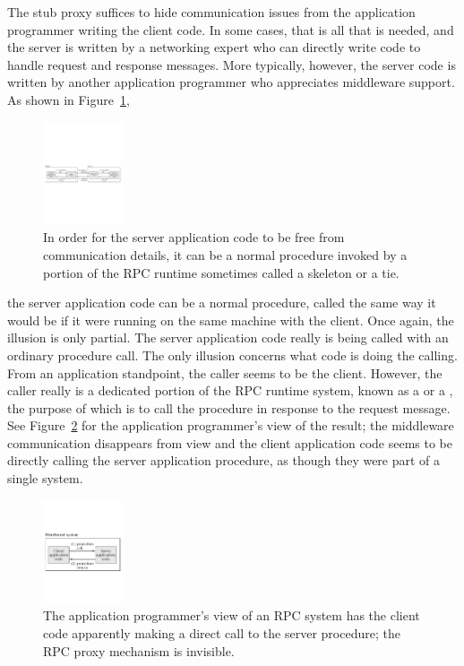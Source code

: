 The stub proxy suffices to hide communication issues from the
application programmer writing the client code.  In some cases, that
is all that is needed, and the server is written by a networking
expert who can directly write code to handle request and response
messages.  More typically, however, the server code is written by
another application programmer who appreciates middleware support.
As shown in Figure~\ref{scan-10-4},
\begin{figure}
\centerline{\includegraphics[height=1.2in]{hail_f1004}}
\caption{In order for the server application code to be free from
  communication details, it can be a normal procedure invoked by a
  portion of the RPC runtime sometimes called a skeleton or a tie.}
\label{scan-10-4}
\end{figure}
the server application code can be a
normal procedure, called the same way it would be if it were running
on the same machine with the client.  Once again, the illusion is only
partial.  The server application code really is being called with an
ordinary procedure call.  The only illusion concerns what code is
doing the calling.  From an application standpoint, the caller seems
to be the client.  However, the caller really is a dedicated portion of the
RPC runtime system, known as a  or a ,
the purpose of which is to call the procedure in response to the
request message.  See Figure~\ref{scan-10-5} for the application
programmer's view of the result; the middleware communication
disappears from view and the client application code seems to be
directly calling the server application procedure, as though they were
part of a single system.
\begin{figure}
\centerline{\includegraphics[height=1.2in]{hail_f1005}}
\caption{The application programmer's view of an RPC system has the
  client code apparently making a direct call to the server procedure;
  the RPC proxy mechanism is invisible.}
\label{scan-10-5}
\end{figure}

